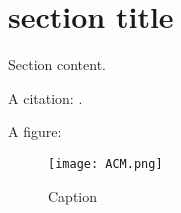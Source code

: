 \section{section title} 

Section content. 

A citation: \cite{ref}.

A figure:

\begin{figure}[h!]
\centering
\texttt{[image: ACM.png]}
\caption{Caption}
\end{figure}
